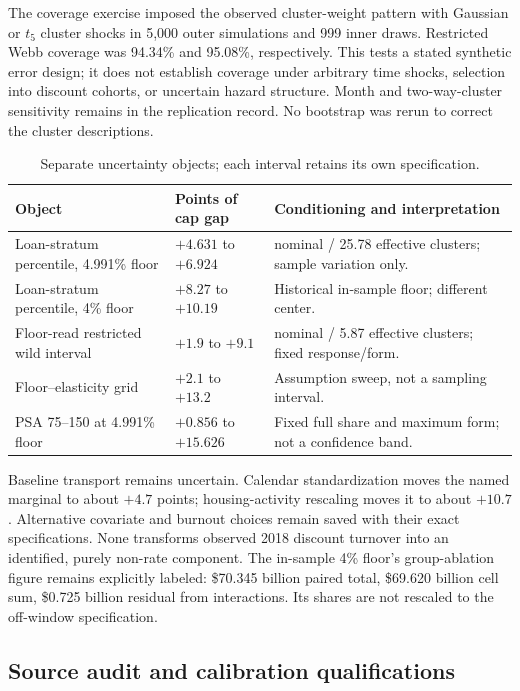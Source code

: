 The coverage exercise imposed the observed cluster-weight pattern with Gaussian or $t_5$ cluster shocks in 5,000 outer simulations and 999 inner draws. Restricted Webb coverage was 94.34\% and 95.08\%, respectively. This tests a stated synthetic error design; it does not establish coverage under arbitrary time shocks, selection into discount cohorts, or uncertain hazard structure. Month and two-way-cluster sensitivity remains in the replication record. No bootstrap was rerun to correct the cluster descriptions.

\begin{table}[H]
\centering\small
\caption{Separate uncertainty objects; each interval retains its own specification.}
\label{tab:inference}
\begin{tabular}{@{}>{\raggedright\arraybackslash}p{4.5cm}>{\raggedright\arraybackslash}p{3.1cm}>{\raggedright\arraybackslash}p{6.8cm}@{}}\toprule
Object & Points of cap gap & Conditioning and interpretation\\\midrule
Loan-stratum percentile, 4.991\% floor & $+4.631$ to $+6.924$ & 130 nominal / 25.78 effective clusters; sample variation only.\\
Loan-stratum percentile, 4\% floor & $+8.27$ to $+10.19$ & Historical in-sample floor; different center.\\
Floor-read restricted wild interval & $+1.9$ to $+9.1$ & 31 nominal / 5.87 effective clusters; fixed response/form.\\
Floor--elasticity grid & $+2.1$ to $+13.2$ & Assumption sweep, not a sampling interval.\\
PSA 75--150 at 4.991\% floor & $+0.856$ to $+15.626$ & Fixed full share and maximum form; not a confidence band.\\\bottomrule
\end{tabular}
\end{table}

Baseline transport remains uncertain. Calendar standardization moves the named marginal to about $+4.7$ points; housing-activity rescaling moves it to about $+10.7$. Alternative covariate and burnout choices remain saved with their exact specifications. None transforms observed 2018 discount turnover into an identified, purely non-rate component. The in-sample 4\% floor's group-ablation figure remains explicitly labeled: \$70.345 billion paired total, \$69.620 billion cell sum, \$0.725 billion residual from interactions. Its shares are not rescaled to the off-window specification.

\subsection{Source audit and calibration qualifications}\label{app:sourceaudit}

